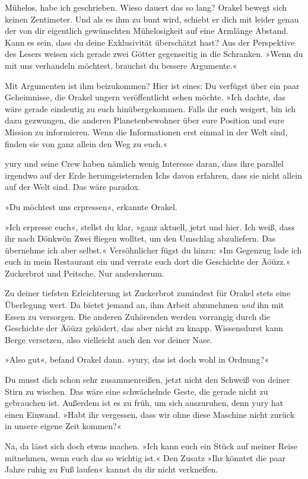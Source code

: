 Mühelos, habe ich geschrieben. Wieso dauert das so lang? Orakel bewegt sich keinen Zentimeter. Und als es ihm zu bunt wird, schiebt er dich mit leider genau der von dir eigentlich gewünschten Mühelosigkeit auf eine Armlänge Abstand. Kann es sein, dass du deine Exklusivität überschätzt hast? Aus der Perspektive des Lesers weisen sich gerade zwei Götter gegenseitig in die Schranken. »Wenn du mit uns verhandeln möchtest, brauchst du bessere Argumente.«

Mit Argumenten ist ihm beizukommen? Hier ist eines: Du verfügst über ein paar Geheimnisse, die Orakel ungern veröffentlicht sehen möchte. »Ich dachte, das wäre gerade eindeutig zu euch hinübergekommen. Falls ihr euch weigert, bin ich dazu gezwungen, die anderen Planetenbewohner über eure Position und eure Mission zu informieren. Wenn die Informationen erst einmal in der Welt sind, finden sie von ganz allein den Weg zu euch.«

yury und seine Crew haben nämlich wenig Interesse daran, dass ihre parallel irgendwo auf der Erde herumgeisternden Ichs davon erfahren, dass sie nicht allein auf der Welt sind. Das wäre paradox.

»Du möchtest uns erpressen«, erkannte Orakel.

»Ich erpresse euch«, stellst du klar, »ganz aktuell, jetzt und hier. Ich weiß, dass ihr nach Dönkwön Zwei fliegen wolltet, um den Umschlag abzuliefern. Das übernehme ich aber selbst.« Versöhnlicher fügst du hinzu: »Im Gegenzug lade ich euch in mein Restaurant ein und verrate euch dort die Geschichte der Äöüzz.« Zuckerbrot und Peitsche. Nur andersherum.

Zu deiner tiefsten Erleichterung ist Zuckerbrot zumindest für Orakel stets eine Überlegung wert. Da bietet jemand an, ihm Arbeit abzunehmen \emph{und} ihn mit Essen zu versorgen. Die anderen Zuhörenden werden vorrangig durch die Geschichte der Äöüzz geködert, das aber nicht zu knapp. Wissensdurst kann Berge versetzen, also vielleicht auch den vor deiner Nase.

»Also gut«, befand Orakel dann. »yury, das ist doch wohl in Ordnung?«

Du musst dich schon sehr zusammenreißen, jetzt nicht den Schweiß von deiner Stirn zu wischen. Das wäre eine schwächelnde Geste, die gerade nicht zu gebrauchen ist. Außerdem ist es zu früh, um sich auszuruhen, denn yury hat einen Einwand. »Habt ihr vergessen, dass wir ohne diese Maschine nicht zurück in unsere eigene Zeit kommen?«

Na, da lässt sich doch etwas machen. »Ich kann euch ein Stück auf meiner Reise mitnehmen, wenn euch das so wichtig ist.« Den Zusatz »Ihr könntet die paar Jahre ruhig zu Fuß laufen« kannst du dir nicht verkneifen.

